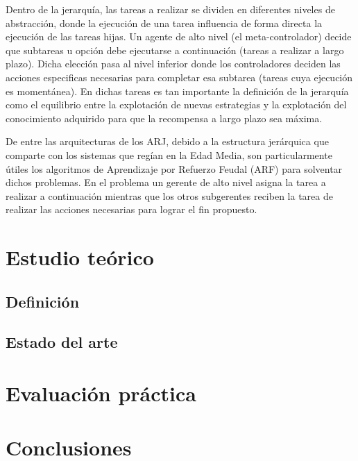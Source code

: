 \documentclass[letterpaper]{article} %
\begin{document}
Dentro de la jerarquía, las tareas a realizar se dividen en diferentes niveles de abstracción, donde la ejecución de una tarea influencia de forma directa la ejecución de las tareas hijas. Un agente de alto nivel (el meta-controlador) decide que subtareas u opción debe ejecutarse a continuación (tareas a realizar a largo plazo). Dicha elección pasa al nivel inferior donde los controladores deciden las acciones especificas necesarias para completar esa subtarea (tareas cuya ejecución es momentánea). En dichas tareas es tan importante la definición de la jerarquía como el equilibrio entre la explotación de nuevas estrategias y la explotación del conocimiento adquirido para que la recompensa a largo plazo sea máxima.

De entre las arquitecturas de los ARJ, debido a la estructura jerárquica que comparte con los sistemas que regían en la Edad Media, son particularmente útiles los algoritmos de Aprendizaje por Refuerzo Feudal (ARF) para solventar dichos problemas. En el problema un gerente de alto nivel asigna la tarea a realizar a continuación mientras que los otros subgerentes reciben la tarea de realizar las acciones necesarias para lograr el fin propuesto.
\cite {Vezhnevets2017FeUdalNF, Dayan1993FeudalRF, Kulkarni2016HierarchicalRL, Vezhnevets2017FeUdalNF, Dayan1993FeudalRF, Kulkarni2016HierarchicalRL}
\section{Estudio teórico}

\subsection{Definición}

\subsection{Estado del arte}

\section{Evaluación práctica}

\section{Conclusiones}






\end{document}
